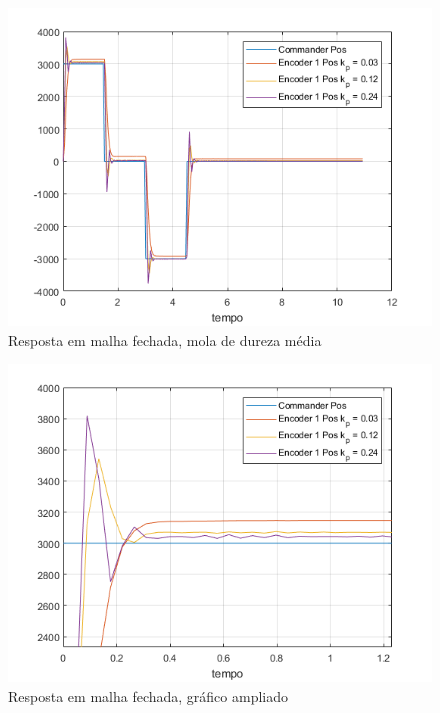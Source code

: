 \documentclass[a4paper,11pt]{article}
\begin{document}
\begin{figure}[H]
\centering
\includegraphics{exp02e06}
\caption{Resposta em malha fechada, mola de dureza média}
\end{figure}
\begin{figure}[H]
\centering
\includegraphics{exp02e06-zoom}
\caption{Resposta em malha fechada, gráfico ampliado}
\end{figure}
\end{document}
